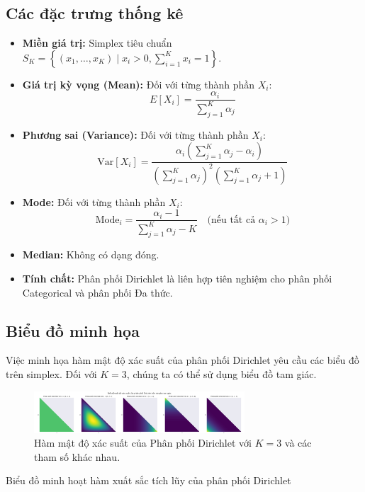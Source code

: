 \subsection{Các đặc trưng thống kê}
\begin{itemize}[leftmargin=*]
\item \textbf{Miền giá trị:} Simplex tiêu chuẩn $S_K = \left\{ (x_1, \dots, x_K) \mid x_i > 0, \sum_{i=1}^K x_i = 1 \right\}$.
\item \textbf{Giá trị kỳ vọng (Mean):} Đối với từng thành phần $X_i$:
\[ E[X_i] = \frac{\alpha_i}{\sum_{j=1}^K \alpha_j} \]
\item \textbf{Phương sai (Variance):} Đối với từng thành phần $X_i$:
\[ \text{Var}[X_i] = \frac{\alpha_i \left( \sum_{j=1}^K \alpha_j - \alpha_i \right)}{\left( \sum_{j=1}^K \alpha_j \right)^2 \left( \sum_{j=1}^K \alpha_j + 1 \right)} \]
\item \textbf{Mode:} Đối với từng thành phần $X_i$:
\[ \text{Mode}_i = \frac{\alpha_i-1}{\sum_{j=1}^K \alpha_j - K} \quad \text{(nếu tất cả } \alpha_i > 1 \text{)} \]
\item \textbf{Median:} Không có dạng đóng.
\item \textbf{Tính chất:} Phân phối Dirichlet là liên hợp tiên nghiệm cho phân phối Categorical và phân phối Đa thức.
\end{itemize}

\subsection{Biểu đồ minh họa}
Việc minh họa hàm mật độ xác suất của phân phối Dirichlet yêu cầu các biểu đồ trên simplex. Đối với $K=3$, chúng ta có thể sử dụng biểu đồ tam giác.

\begin{figure}[h!]
\centering
\includegraphics[width=0.7\textwidth]{images/Dirichlet_Distribution_PDF.png} %
\caption{Hàm mật độ xác suất của Phân phối Dirichlet với $K=3$ và các tham số khác nhau.}
\label{fig:pngDirichlet_Distribution_PDF}
\end{figure}

Biểu đồ minh hoạt hàm xuất sắc tích lũy của phân phối Dirichlet

